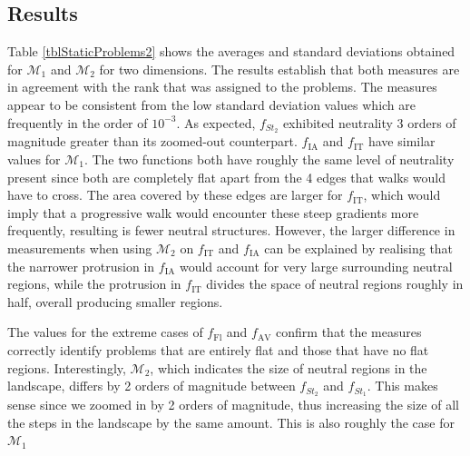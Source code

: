 \documentclass[conference]{IEEEtran}
\begin{document}
\subsection{Results}
\label{visualResults}
Table \ref{tblStaticProblems2} shows the averages and standard deviations obtained for ${\mathcal{M}_1}$ and ${\mathcal{M}_2}$ for two dimensions. The results establish that both measures are in agreement with the rank that was assigned to the problems. The measures appear to be consistent from the low standard deviation values which are frequently in the order of $10^{-3}$. As expected, $f_{\textit{St}_2}$ exhibited neutrality 3 orders of magnitude greater than its zoomed-out counterpart. $f_{\text{IA}}$ and 	$f_{\text{IT}}$ have similar values for ${\mathcal{M}_1}$. The two functions both have roughly the same level of neutrality present since both are completely flat apart from the 4 edges that walks would have to cross. The area covered by these edges are larger for $f_{\text{IT}}$, which would imply that a progressive walk would encounter these steep gradients more frequently, resulting is fewer neutral structures. However, the larger difference in measurements when using ${\mathcal{M}_2}$ on $f_{\text{IT}}$ and $f_{\text{IA}}$ can be explained by realising that the narrower protrusion in $f_{\text{IA}}$ would account for very large surrounding neutral regions, while the protrusion in $f_{\text{IT}}$ divides the space of neutral regions roughly in half, overall producing smaller regions. 

The values for the extreme cases of $f_{\text{Fl}}$ and $f_{\text{AV}}$ confirm that the measures correctly identify problems that are entirely flat and those that have no flat regions. Interestingly, ${\mathcal{M}_2}$, which indicates the size of neutral regions in the landscape, differs by 2 orders of magnitude between  $f_{\textit{St}_2}$ and  $f_{\textit{St}_1}$. This makes sense since we zoomed in by 2 orders of magnitude, thus increasing the size of all the steps in the landscape by the same amount. This is also roughly the case for ${\mathcal{M}_1}$
\end{document}
